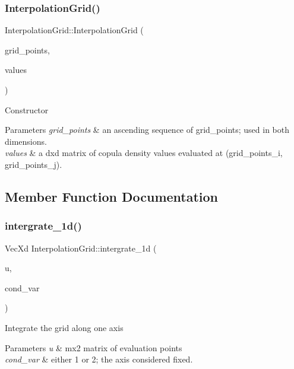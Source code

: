\subsubsection{\texorpdfstring{Interpolation\+Grid()}{InterpolationGrid()}}
{\footnotesize\ttfamily Interpolation\+Grid\+::\+Interpolation\+Grid (\begin{DoxyParamCaption}\item[{const Vec\+Xd \&}]{grid\+\_\+points,  }\item[{const Mat\+Xd \&}]{values }\end{DoxyParamCaption})}

Constructor


\begin{DoxyParams}{Parameters}
{\em grid\+\_\+points} & an ascending sequence of grid\+\_\+points; used in both dimensions. \\
\hline
{\em values} & a dxd matrix of copula density values evaluated at (grid\+\_\+points\+\_\+i, grid\+\_\+points\+\_\+j). \\
\hline
\end{DoxyParams}


\subsection{Member Function Documentation}
\mbox{\label{class_interpolation_grid_a90af7bd3f2646109be939fc48b2284ca}} 
\subsubsection{\texorpdfstring{intergrate\+\_\+1d()}{intergrate\_1d()}}
{\footnotesize\ttfamily Vec\+Xd Interpolation\+Grid\+::intergrate\+\_\+1d (\begin{DoxyParamCaption}\item[{const Mat\+Xd \&}]{u,  }\item[{const int \&}]{cond\+\_\+var }\end{DoxyParamCaption})}

Integrate the grid along one axis


\begin{DoxyParams}{Parameters}
{\em u} & mx2 matrix of evaluation points \\
\hline
{\em cond\+\_\+var} & either 1 or 2; the axis considered fixed. \\
\hline
\end{DoxyParams}
\mbox{\label{class_interpolation_grid_a9e65596940b5e561ef6332d2559feb57}} 
